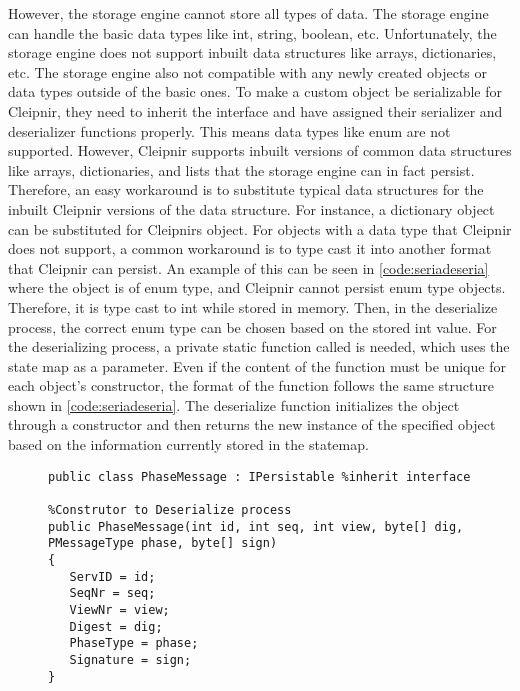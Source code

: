 However, the storage engine cannot store all types of data. The storage engine can handle the basic data types like int, string, boolean, etc. Unfortunately, the storage engine does not support inbuilt data structures like arrays, dictionaries, etc. The storage engine also not compatible with any newly created objects or data types outside of the basic ones. To make a custom object be serializable for Cleipnir, they need to inherit the  interface and have assigned their serializer and deserializer functions properly. This means data types like enum are not supported. However, Cleipnir supports inbuilt versions of common data structures like arrays, dictionaries, and lists that the storage engine can in fact persist. Therefore, an easy workaround is to substitute typical data structures for the inbuilt Cleipnir versions of the data structure. For instance, a dictionary object can be substituted for Cleipnirs  object. For objects with a data type that Cleipnir does not support, a common workaround is to type cast it into another format that Cleipnir can persist. 
An example of this can be seen in \autoref{code:seriadeseria} where the object  is of enum type, and Cleipnir cannot persist enum type objects. Therefore, it is type cast to int while stored in memory. Then, in the deserialize process, the correct enum type can be chosen based on the stored int value. For the deserializing process, a private static function called  is needed, which uses the state map as a parameter. Even if the content of the function must be unique for each object’s constructor, the format of the function follows the same structure shown in \autoref{code:seriadeseria}. The deserialize function initializes the object through a constructor and then returns the new instance of the specified object based on the information currently stored in the statemap.

\begin{figure}[H]
	\centering
	\begin{lstlisting}[label = code:interfaceexample, caption=Persistent initialize process, captionpos=b, basicstyle=\scriptsize]
public class PhaseMessage : IPersistable %inherit interface
		
%Construtor to Deserialize process
public PhaseMessage(int id, int seq, int view, byte[] dig, PMessageType phase, byte[] sign)
{
   ServID = id;
   SeqNr = seq;
   ViewNr = view;
   Digest = dig;
   PhaseType = phase;
   Signature = sign;
}
	\end{lstlisting}
\end{figure}

